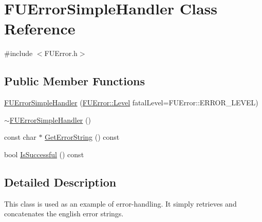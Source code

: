 \hypertarget{classFUErrorSimpleHandler}{
\section{FUErrorSimpleHandler Class Reference}
\label{classFUErrorSimpleHandler}
}


{\ttfamily \#include $<$FUError.h$>$}

\subsection*{Public Member Functions}
\begin{DoxyCompactItemize}
\item 
\hyperlink{classFUErrorSimpleHandler_a4034c1683dbd2cc0772da6e45763966c}{FUErrorSimpleHandler} (\hyperlink{classFUError_ac4b066f99c221e180ecfe9183fabbf3c}{FUError::Level} fatalLevel=FUError::ERROR\_\-LEVEL)
\item 
\hyperlink{classFUErrorSimpleHandler_a5cf911f79fe4b88fa05c5bb70d990213}{$\sim$FUErrorSimpleHandler} ()
\item 
const char $\ast$ \hyperlink{classFUErrorSimpleHandler_a8b33581ea5ea79b7fdeacae91b064070}{GetErrorString} () const 
\item 
bool \hyperlink{classFUErrorSimpleHandler_a38cd13df513461501d31bd541b7a6098}{IsSuccessful} () const 
\end{DoxyCompactItemize}


\subsection{Detailed Description}
This class is used as an example of error-\/handling. It simply retrieves and concatenates the english error strings. 

